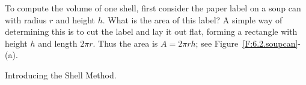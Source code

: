 To compute the volume of one shell, first consider the paper label on a soup can with radius $r$ and height $h$. What is the area of this label? A simple way of determining this is to cut the label and lay it out flat, forming a rectangle with height $h$ and length $2\pi r$. Thus the area is $A = 2\pi rh$; see Figure~\ref{F:6.2.soupcan}-(a).

\begin{marginfigure}[-1cm] %
\begin{center}


\caption{Introducing the Shell Method.}\label{fig:6.2.shell}
\end{center}
\end{marginfigure}

